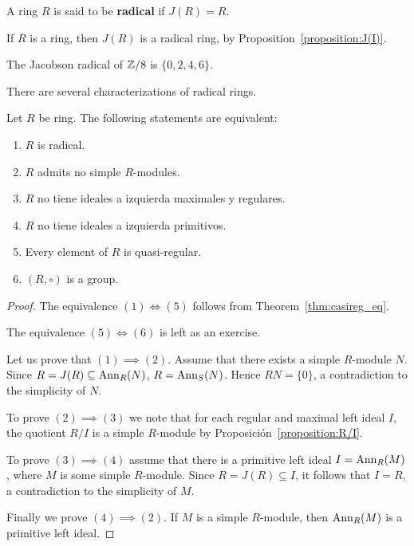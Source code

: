 \begin{definition}
A ring $R$ is said to be \textbf{radical} if $J(R)=R$. 
\end{definition}

\begin{example}
	If $R$ is a ring, then $J(R)$ is a radical ring, by Proposition~\ref{proposition:J(I)}.
\end{example}

\begin{example}
	The Jacobson radical of $\mathbb{Z}/8$ is $\{0,2,4,6\}$. 
\end{example}

There are several characterizations of radical rings. 

\begin{theorem}
	\label{theorem:anillo_radical}
	Let $R$ be ring. The following statements are equivalent: 
	\begin{enumerate}
		\item $R$ is radical.
		\item $R$ admits no simple $R$-modules. 
		\item $R$ no tiene ideales a izquierda maximales y regulares.
		\item $R$ no tiene ideales a izquierda primitivos.
		\item Every element of $R$ is quasi-regular. 
		\item $(R,\circ)$ is a group. 
	\end{enumerate}
\end{theorem}

\begin{proof}
	The equivalence $(1)\Longleftrightarrow(5)$ follows from 
	Theorem~\ref{thm:casireg_eq}. 
    
    The equivalence $(5)\Longleftrightarrow(6)$ is left as an exercise. 

	Let us prove that $(1)\implies(2)$. Assume that there exists a simple $R$-module $N$. Since 
	$R=J(R)\subseteq\operatorname{Ann}_R(N)$, $R=\operatorname{Ann}_S(N)$. 
	Hence $RN=\{0\}$, a contradiction to the simplicity of $N$.
	
	To prove $(2)\implies(3)$ we note that for each regular and maximal left ideal 
	$I$, the quotient $R/I$ is a simple $R$-module by
	Proposición~\ref{proposition:R/I}. 
	
	To prove $(3)\implies(4)$ assume that there is a primitive left ideal 
	$I=\operatorname{Ann}_R(M)$, where $M$ is some simple $R$-module. Since $R=J(R)\subseteq I$, it follows that  
    $I=R$, a contradiction to the simplicity of $M$.

	Finally we prove $(4)\implies(2)$. If $M$ is a simple $R$-module, then 
	$\operatorname{Ann}_R(M)$ is a primitive left ideal.
\end{proof}

